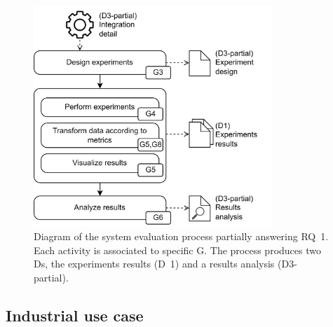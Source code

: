 \begin{figure}[!ht]
    \begin{center}
    \includegraphics[width=0.8\textwidth]{figures/3-method/method_exp.png}
    \caption[System evaluation process - Hudi vs. Iceberg]{Diagram of the system evaluation process partially answering \gls{RQ}~1. Each activity is associated to specific \gls{G}. The process produces two \glspl{D}, the experiments results (\gls{D}~1) and a results analysis (\gls{D}3-partial).}
    \label{fig:method_experiments}
    \end{center}
\end{figure}


\subsection{Industrial use case}
\label{subsec:method_use_case}

